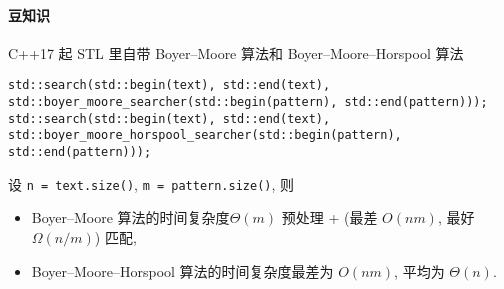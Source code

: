 \paragraph{豆知识}

C++17 起 STL 里自带 Boyer--Moore 算法和 Boyer--Moore--Horspool 算法

\begin{verbatim}
std::search(std::begin(text), std::end(text), std::boyer_moore_searcher(std::begin(pattern), std::end(pattern)));
std::search(std::begin(text), std::end(text), std::boyer_moore_horspool_searcher(std::begin(pattern), std::end(pattern)));
\end{verbatim}

设 \verb|n = text.size()|, \verb|m = pattern.size()|, 则

\begin{itemize}
    \item Boyer--Moore 算法的时间复杂度\(\Theta(m)\) 预处理 + (最差 \(O(nm)\), 最好 \(\Omega(n/m)\)) 匹配, \cite{enwiki:1185721721}
    \item Boyer--Moore--Horspool 算法的时间复杂度最差为 \(O(nm)\), 平均为 \(\Theta(n)\). \cite{enwiki:1136480391}
\end{itemize}
